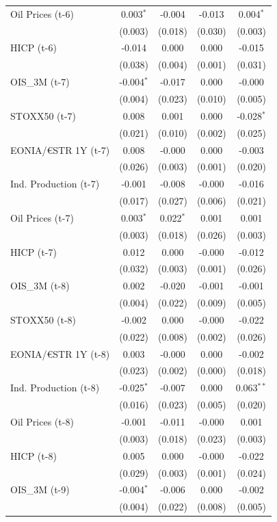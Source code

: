 \begin{longtable}[t]{lcccc}
Oil Prices (t-6) & 0.003$^{*}$ & -0.004 & -0.013 & 0.004$^{*}$\\
 & (0.003) & (0.018) & (0.030) & (0.003)\\
HICP (t-6) & -0.014 & 0.000 & 0.000 & -0.015\\
 & (0.038) & (0.004) & (0.001) & (0.031)\\
OIS\_3M (t-7) & -0.004$^{*}$ & -0.017 & 0.000 & -0.000\\
 & (0.004) & (0.023) & (0.010) & (0.005)\\
STOXX50 (t-7) & 0.008 & 0.001 & 0.000 & -0.028$^{*}$\\
 & (0.021) & (0.010) & (0.002) & (0.025)\\
EONIA/€STR 1Y (t-7) & 0.008 & -0.000 & 0.000 & -0.003\\
 & (0.026) & (0.003) & (0.001) & (0.020)\\
Ind. Production (t-7) & -0.001 & -0.008 & -0.000 & -0.016\\
 & (0.017) & (0.027) & (0.006) & (0.021)\\
Oil Prices (t-7) & 0.003$^{*}$ & 0.022$^{*}$ & 0.001 & 0.001\\
 & (0.003) & (0.018) & (0.026) & (0.003)\\
HICP (t-7) & 0.012 & 0.000 & -0.000 & -0.012\\
 & (0.032) & (0.003) & (0.001) & (0.026)\\
OIS\_3M (t-8) & 0.002 & -0.020 & -0.001 & -0.001\\
 & (0.004) & (0.022) & (0.009) & (0.005)\\
STOXX50 (t-8) & -0.002 & 0.000 & -0.000 & -0.022\\
 & (0.022) & (0.008) & (0.002) & (0.026)\\
EONIA/€STR 1Y (t-8) & 0.003 & -0.000 & 0.000 & -0.002\\
 & (0.023) & (0.002) & (0.000) & (0.018)\\
Ind. Production (t-8) & -0.025$^{*}$ & -0.007 & 0.000 & 0.063$^{**}$\\
 & (0.016) & (0.023) & (0.005) & (0.020)\\
Oil Prices (t-8) & -0.001 & -0.011 & -0.000 & 0.001\\
 & (0.003) & (0.018) & (0.023) & (0.003)\\
HICP (t-8) & 0.005 & 0.000 & -0.000 & -0.022\\
 & (0.029) & (0.003) & (0.001) & (0.024)\\
OIS\_3M (t-9) & -0.004$^{*}$ & -0.006 & 0.000 & -0.002\\
 & (0.004) & (0.022) & (0.008) & (0.005)\\

\end{longtable}

